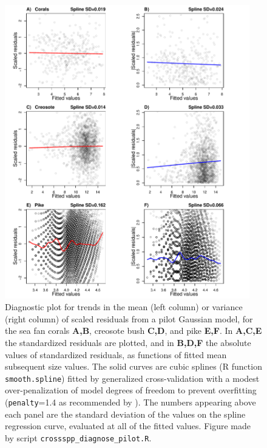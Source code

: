 \documentclass[12pt]{article}
\begin{document}
\begin{spacing}{1.35}
\begin{figure}[tbp]
	\centering
	\includegraphics[width=0.95\textwidth]{figures/diagnose_pilot_supplement.pdf}
	\caption{Diagnostic plot for trends in the mean (left column) or variance (right column) of scaled residuals from a pilot Gaussian model, for the sea fan corals \textbf{A,B}, creosote bush \textbf{C,D}, and pike \textbf{E,F}. 
In \textbf{A,C,E} the standardized residuals are plotted, and in \textbf{B,D,F} the absolute values of
standardized residuals, as functions of fitted mean subsequent size values. The solid curves are cubic splines (R function \texttt{smooth.spline}) fitted by generalized cross-validation with a modest over-penalization of model degrees of freedom to prevent overfitting (\texttt{penalty}=1.4 as recommended by \citet{gu-2013}). The numbers appearing above each panel are the standard deviation of the values on the spline regression curve, evaluated at all of the 
fitted values. Figure made by script \texttt{crossspp\_diagnose\_pilot.R}.}
\label{fig:diagnose_pilot_supplement}
\end{figure}



\end{spacing}
\end{document}
